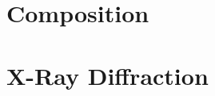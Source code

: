 
\section{Composition}
\label{chap:Results-Composition}

\lipsum



\section{X-Ray Diffraction}
\label{chap:Results-XRD}

\lipsum








